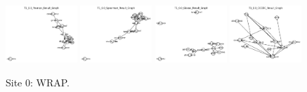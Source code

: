 \begin{figure}
    \includegraphics[width=0.24\textwidth]{diss/7_cond/figs/T1_0.0_Pearson_Result_Graph.png}
    \includegraphics[width=0.24\textwidth]{diss/7_cond/figs/T1_0.0_Spearman_Result_Graph.png}
    \includegraphics[width=0.24\textwidth]{diss/7_cond/figs/T1_0.0_Glasso_Result_Graph.png}
    \includegraphics[width=0.24\textwidth]{diss/7_cond/figs/T1_0.0_CODEC_Result_Graph.png}
    \caption{Site 0: WRAP.}
    \label{fig:site0}
\end{figure}

